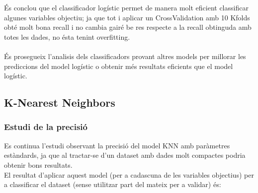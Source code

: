 \documentclass[a4paper, 11pt]{article}
\begin{document}
És conclou que el classificador logístic permet de manera molt eficient classificar algunes variables objectiu; ja que tot i aplicar un CrossValidation amb 10 Kfolds obté molt bona recall i no cambia gairé be res respecte a la recall obtinguda amb totes les dades, no ésta tenint overfitting.\\\\
És prosegueix l'analisis dels classificadors provant altres models per millorar les prediccions del model logístic o obtenir més resultats eficients que el model logístic.
\newpage


\subsection{K-Nearest Neighbors}\label{KNN}
\subsubsection{Estudi de la precisió}
Es continua l'estudi observant la precisió del model KNN amb paràmetres estàndards, ja que al tractar-se d'un dataset amb dades molt compactes podria obtenir bons resultats.\\
El resultat d'aplicar aquest model (per a cadascuna de les variables objectius) per a classificar el dataset (sense utilitzar part del mateix per a validar) és:
\end{document}
